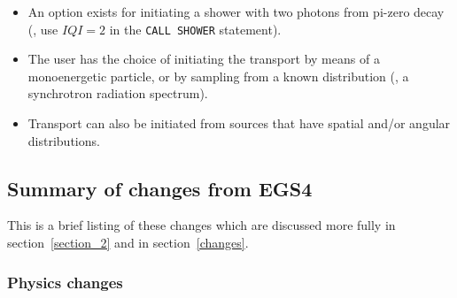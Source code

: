 \begin{itemize}
\begin{itemize}
  \item An option exists for initiating a shower with two
  photons from pi-zero decay (\ie, use $IQI=2$ in the
  {\tt CALL SHOWER} statement).

  \item The user has the choice of initiating the transport
  by means of a monoenergetic particle, or by sampling from
  a known distribution (\eg, a synchrotron radiation spectrum).

  \item Transport can also be initiated from sources that have
  spatial and/or angular distributions.

  \end{itemize}
\end{itemize}


\newpage
\subsection{Summary of changes from EGS4}
\label{changes_summary}
This is a brief listing of these changes which are discussed more fully in
section~\ref{section_2} and in section~\ref{changes}.

\subsubsection{Physics changes}

